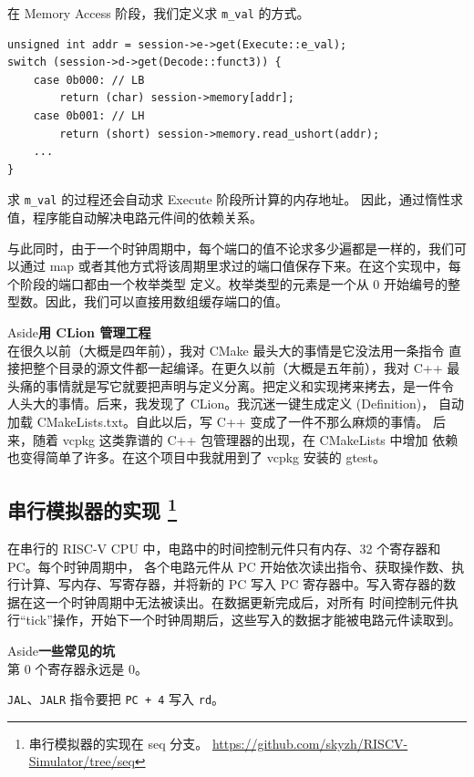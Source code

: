 \documentclass[12pt]{article}
\newenvironment{aside}[1]
    { \begin{tcolorbox}[enlarge top by=0.5cm, enlarge bottom by=0.5cm] Aside\space\space\space\space \textbf{#1} \\
        } { \end{tcolorbox} }
\begin{document}
    在 Memory Access 阶段，我们定义求 \texttt{m\_val} 的方式。

    \begin{verbatim}
unsigned int addr = session->e->get(Execute::e_val);
switch (session->d->get(Decode::funct3)) {
    case 0b000: // LB
        return (char) session->memory[addr];
    case 0b001: // LH
        return (short) session->memory.read_ushort(addr);
    ...
}
    \end{verbatim}

    求 \texttt{m\_val} 的过程还会自动求 Execute 阶段所计算的内存地址。
    因此，通过惰性求值，程序能自动解决电路元件间的依赖关系。

    与此同时，由于一个时钟周期中，每个端口的值不论求多少遍都是一样的，我们可以通过 map
    或者其他方式将该周期里求过的端口值保存下来。在这个实现中，每个阶段的端口都由一个枚举类型
    定义。枚举类型的元素是一个从 0 开始编号的整型数。因此，我们可以直接用数组缓存端口的值。
    
    \begin{aside}{用 CLion 管理工程}
        在很久以前（大概是四年前），我对 CMake 最头大的事情是它没法用一条指令
        直接把整个目录的源文件都一起编译。在更久以前（大概是五年前），我对 C++
        最头痛的事情就是写它就要把声明与定义分离。把定义和实现拷来拷去，是一件令
        人头大的事情。后来，我发现了 CLion。我沉迷一键生成定义 (Definition)，
        自动加载 CMakeLists.txt。自此以后，写 C++ 变成了一件不那么麻烦的事情。
        后来，随着 vcpkg 这类靠谱的 C++ 包管理器的出现，在 CMakeLists 中增加
        依赖也变得简单了许多。在这个项目中我就用到了 vcpkg 安装的 gtest。
    \end{aside}

    \subsection{串行模拟器的实现\protect
        \footnote{串行模拟器的实现在 seq 分支。
        \url{https://github.com/skyzh/RISCV-Simulator/tree/seq}}}

    在串行的 RISC-V CPU 中，电路中的时间控制元件只有内存、32 个寄存器和 PC。每个时钟周期中，
    各个电路元件从 PC 开始依次读出指令、获取操作数、执行计算、写内存、写寄存器，并将新的 PC
    写入 PC 寄存器中。写入寄存器的数据在这一个时钟周期中无法被读出。在数据更新完成后，对所有
    时间控制元件执行``tick''操作，开始下一个时钟周期后，这些写入的数据才能被电路元件读取到。

    \begin{aside}{一些常见的坑}
        第 0 个寄存器永远是 0。
        
        \texttt{JAL}、\texttt{JALR} 指令要把 \texttt{PC + 4} 写入 \texttt{rd}。
    \end{aside}
\end{document}
